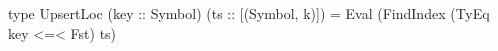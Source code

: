 \begin{code}
type UpsertLoc (key :: Symbol)
               (ts :: [(Symbol, k)]) =
  Eval (FindIndex (TyEq key <=< Fst) ts)
\end{code}
